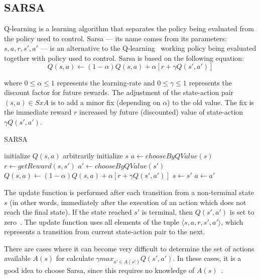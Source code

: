 \subsection{SARSA}
\label{subsec:sarsa}

Q-learning is a learning algorithm that separates the policy being evaluated from the policy used to control.
Sarsa --- its name comes from its parameters: $s,a,r,s',a'$ --- is an alternative to the Q-learning~\cite{graepel2004learningfight,stone2005reinforcement}
working policy being evaluated together with policy used to control.
Sarsa is based on the following equation:
\[ Q(s,a) \leftarrow (1 - \alpha) Q(s,a) + \alpha[r + \gamma Q(s',a')] \]

where $0 \leq \alpha \leq 1$ represents the learning-rate and $0 \leq \gamma \leq 1$ represents the discount factor for future rewards.
The adjustment of the state-action pair $(s,a) \in SxA$ is to add a minor fix (depending on $\alpha$) to the old value.
The fix is the immediate reward $r$ increased by future (discounted) value of state-action $\gamma Q(s',a')$.

\begin{algorithm}
	\caption{SARSA}
	\label{alg:sarsa}
	\begin{algorithmic}[1]
		\STATE initialize $Q(s,a)$ arbitrarily
			\STATE initialize $s$
			\STATE $a \gets chooseByQValue(s)$
				\STATE $r \gets getReward(s,s')$
				\STATE $a' \gets chooseByQValue(s')$
				\STATE $Q(s,a) \gets (1 - \alpha) Q(s,a) + \alpha[r + \gamma Q(s',a')]$
				\STATE $s \gets s'$
				\STATE $a \gets a'$
			\ENDFOR
		\ENDFOR
	\end{algorithmic}
\end{algorithm}

The update function is performed after each transition from a non-terminal state $s$ (in other words, immediately after the execution of an action which does not reach the final state).
If the state reached $s'$ is terminal, then $Q(s',a')$ is set to zero~\cite{sutton1998reinforcement}.
The update function uses all elements of the tuple $\langle s,a,r,s',a' \rangle$, which represents a transition from current state-action pair to the next.

There are cases where it can become very difficult to determine the set of actions available $A(s)$ for calculate $\gamma max_{a' \in A(s')}Q(s',a')$.
In these cases, it is a good idea to choose Sarsa, since this requires no knowledge of $A(s)$~\cite{graepel2004learningfight}.



